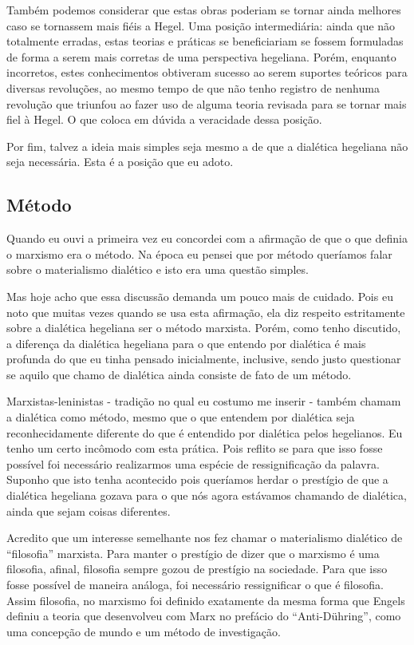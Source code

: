 Também podemos considerar que estas obras poderiam se tornar ainda melhores caso se tornassem mais fiéis a Hegel. Uma posição intermediária: ainda que não totalmente erradas, estas teorias e práticas se beneficiariam se fossem formuladas de forma a serem mais corretas de uma perspectiva hegeliana. Porém, enquanto incorretos, estes conhecimentos obtiveram sucesso ao serem suportes teóricos para diversas revoluções, ao mesmo tempo de que não tenho registro de nenhuma revolução que triunfou ao fazer uso de alguma teoria revisada para se tornar mais fiel à Hegel. O que coloca em dúvida a veracidade dessa posição.

Por fim, talvez a ideia mais simples seja mesmo a de que a dialética hegeliana não seja necessária. Esta é a posição que eu adoto.

\subsection{Método}

Quando eu ouvi a primeira vez eu concordei com a afirmação de que o que definia o marxismo era o método. Na época eu pensei que por método queríamos falar sobre o materialismo dialético e isto era uma questão simples.

Mas hoje acho que essa discussão demanda um pouco mais de cuidado. Pois eu noto que muitas vezes quando se usa esta afirmação, ela diz respeito estritamente sobre a dialética hegeliana ser o método marxista. Porém, como tenho discutido, a diferença da dialética hegeliana para o que entendo por dialética é mais profunda do que eu tinha pensado inicialmente, inclusive, sendo justo questionar se aquilo que chamo de dialética ainda consiste de fato de um método.

Marxistas-leninistas - tradição no qual eu costumo me inserir - também chamam a dialética como método, mesmo que o que entendem por dialética seja reconhecidamente diferente do que é entendido por dialética pelos hegelianos. Eu tenho um certo incômodo com esta prática. Pois reflito se para que isso fosse possível foi necessário realizarmos uma espécie de ressignificação da palavra. Suponho que isto tenha acontecido pois queríamos herdar o prestígio de que a dialética hegeliana gozava para o que nós agora estávamos chamando de dialética, ainda que sejam coisas diferentes.

Acredito que um interesse semelhante nos fez chamar o materialismo dialético de “filosofia” marxista. Para manter o prestígio de dizer que o marxismo é uma filosofia, afinal, filosofia sempre gozou de prestígio na sociedade. Para que isso fosse possível de maneira análoga, foi necessário ressignificar o que é filosofia. Assim filosofia, no marxismo foi definido exatamente da mesma forma que Engels definiu a teoria que desenvolveu com Marx no prefácio do “Anti-Dühring”, como uma concepção de mundo e um método de investigação.

